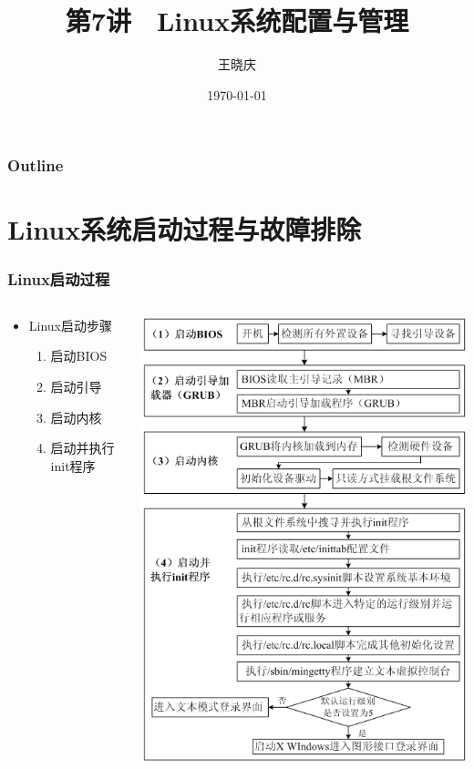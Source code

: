 \documentclass[xcolor=svgnames,presentation]{beamer}
\title{第7讲　Linux系统配置与管理}
\author{王晓庆}
\date{\today}
\institute{wangxiaoqing@outlook.com}
\begin{document}
\maketitle

\begin{frame}
\frametitle{Outline}
\setcounter{tocdepth}{1}
\tableofcontents
\end{frame}
\section{Linux系统启动过程与故障排除}
\label{sec-1}
\begin{frame}
\frametitle{Linux启动过程}
\label{sec-1-1}
\begin{columns}
\begin{column}{0.5\textwidth}
\begin{itemize}

\item Linux启动步骤
\label{sec-1-1-1}%
\begin{enumerate}
\item 启动BIOS
\item 启动引导
\item 启动内核
\item 启动并执行init程序
\end{enumerate}
\end{itemize} %
\end{column}
\begin{column}{0.5\textwidth}
\label{sec-1-1-2}

\includegraphics[width=.9\linewidth]{img/linuxboot.png}
\end{column}
\end{columns}
\end{frame}
\end{document}
